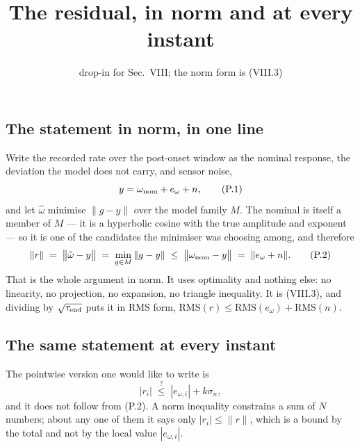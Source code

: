 \documentclass[10pt]{article}
\title{\vspace{-16mm}\textbf{The residual, in norm and at every
instant}\vspace{-3mm}}
\date{\small drop-in for Sec.~VIII; the norm form is (VIII.3)}
\begin{document}
\maketitle

\subsection{The statement in norm, in one line}

Write the recorded rate over the post-onset window as the nominal
response, the deviation the model does not carry, and sensor noise,
\begin{equation}
  y = \omega_{\rm nom} + e_\omega + n ,
  \tag{P.1}
\end{equation}
and let $\hat\omega$ minimise $\|g-y\|$ over the model family $M$. The
nominal is itself a member of $M$ --- it is a hyperbolic cosine with the
true amplitude and exponent --- so it is one of the candidates the
minimiser was choosing among, and therefore
\begin{equation}
  \|r\| \;=\; \bigl\|\hat\omega - y\bigr\|
  \;=\; \min_{g\in M}\|g-y\|
  \;\le\; \bigl\|\omega_{\rm nom} - y\bigr\|
  \;=\; \|e_\omega + n\| .
  \tag{P.2}
\end{equation}
That is the whole argument in norm. It uses optimality and nothing else:
no linearity, no projection, no expansion, no triangle inequality. It is
(VIII.3), and dividing by $\sqrt{\tau_{\rm end}}$ puts it in RMS form,
$\mathrm{RMS}(r) \le \mathrm{RMS}(e_\omega) + \mathrm{RMS}(n)$.

\subsection{The same statement at every instant}

The pointwise version one would like to write is
\begin{equation}
  |r_i| \;\overset{?}{\le}\; |e_{\omega,i}| + k\sigma_n ,
  \tag{P.3}
\end{equation}
and it does not follow from (P.2). A norm inequality constrains a sum of
$N$ numbers; about any one of them it says only $|r_i|\le\|r\|$, which
is a bound by the total and not by the local value $|e_{\omega,i}|$.
\end{document}
